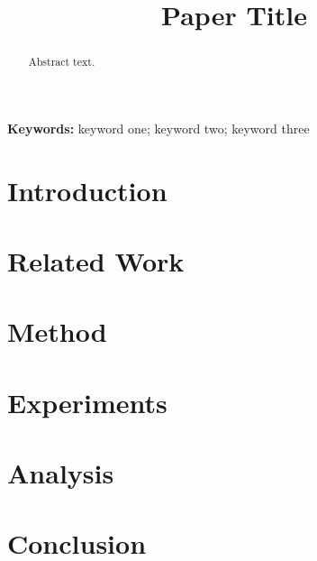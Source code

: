 \documentclass[11pt]{article}
\title{Paper Title}
\author{}
\date{}
\begin{document}
\maketitle

\begin{abstract}
Abstract text.
\end{abstract}

\noindent\textbf{Keywords:} keyword one; keyword two; keyword three

\section{Introduction}

\section{Related Work}

\section{Method}

\section{Experiments}

\section{Analysis}

\section{Conclusion}



\end{document}
